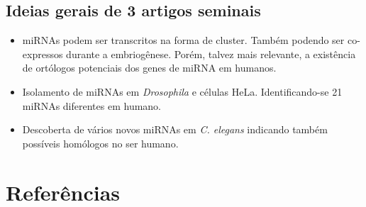 \documentclass[
]{book}
\begin{document}
\hypertarget{ideias-gerais-de-3-artigos-seminais}{%
\section{Ideias gerais de 3 artigos seminais}\label{ideias-gerais-de-3-artigos-seminais}}

\begin{itemize}
\item
  \citep{Lau_2001} miRNAs podem ser transcritos na forma de cluster. Também podendo ser co-expressos durante a embriogênese. Porém, talvez mais relevante, a existência de ortólogos potenciais dos genes de miRNA em humanos.
\item
  \citep{Lagos_Quintana_2001} Isolamento de miRNAs em \emph{Drosophila} e células HeLa. Identificando-se 21 miRNAs diferentes em humano.
\item
  \citep{Lee_2001} Descoberta de vários novos miRNAs em \emph{C. elegans} indicando também possíveis homólogos no ser humano.
\end{itemize}

\hypertarget{referuxeancias}{%
\chapter{Referências}\label{referuxeancias}}

  
\end{document}
